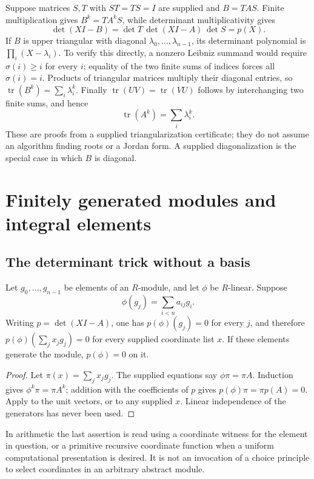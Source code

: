 Suppose matrices $S,T$ with $ST=TS=I$ are supplied and $B=TAS$.
Finite multiplication gives $B^k=TA^kS$, while determinant
multiplicativity gives
\[
 \det(XI-B)=\det T\,\det(XI-A)\,\det S=p(X).
\]
If $B$ is upper triangular with diagonal $\lambda_0,\ldots,\lambda_{n-1}$,
its determinant polynomial is $\prod_i(X-\lambda_i)$. To verify this
directly, a nonzero Leibniz summand would require $\sigma(i)\geq i$ for
every $i$; equality of the two finite sums of indices forces all
$\sigma(i)=i$. Products of triangular matrices multiply their diagonal
entries, so $\operatorname{tr}(B^k)=\sum_i\lambda_i^k$.
Finally $\operatorname{tr}(UV)=\operatorname{tr}(VU)$ follows by
interchanging two finite sums, and hence
\[
 \operatorname{tr}(A^k)=\sum_i\lambda_i^k.
\]
These are proofs from a supplied triangularization certificate; they do
not assume an algorithm finding roots or a Jordan form. A supplied
diagonalization is the special case in which $B$ is diagonal.

\section{Finitely generated modules and integral elements}

\subsection{The determinant trick without a basis}

\begin{proposition}
Let $g_0,\ldots,g_{n-1}$ be elements of an $R$-module, and let $\phi$ be
$R$-linear. Suppose
\[
 \phi(g_j)=\sum_{i<n}a_{ij}g_i.
\]
Writing $p=\det(XI-A)$, one has $p(\phi)(g_j)=0$ for every $j$, and
therefore $p(\phi)(\sum_jx_jg_j)=0$ for every supplied coordinate list
$x$. If these elements generate the module, $p(\phi)=0$ on it.
\end{proposition}
\begin{proof}
Let $\pi(x)=\sum_jx_jg_j$. The supplied equations say
$\phi\pi=\pi A$. Induction gives $\phi^k\pi=\pi A^k$; addition with the
coefficients of $p$ gives $p(\phi)\pi=\pi p(A)=0$. Apply to the unit
vectors, or to any supplied $x$. Linear independence of the generators
has never been used.
\end{proof}

In arithmetic the last assertion is read using a coordinate witness for
the element in question, or a primitive recursive coordinate function
when a uniform computational presentation is desired. It is not an
invocation of a choice principle to select coordinates in an arbitrary
abstract module.

